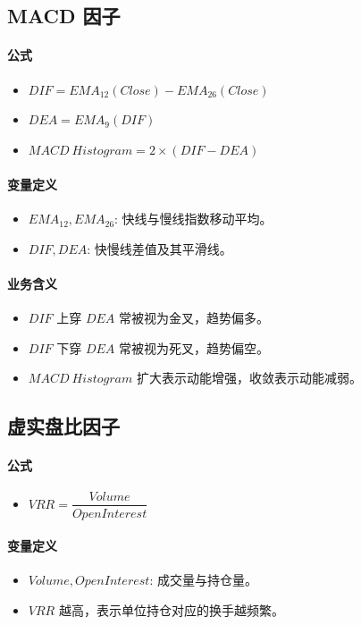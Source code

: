 \documentclass[11pt,a4paper]{ctexart}
\begin{document}
\subsection{MACD 因子}
\paragraph{公式}
\begin{itemize}
\item $DIF=EMA_{12}(Close)-EMA_{26}(Close)$
\item $DEA=EMA_{9}(DIF)$
\item $MACD\ Histogram=2\times(DIF-DEA)$
\end{itemize}
\paragraph{变量定义}
\begin{itemize}
\item $EMA_{12}, EMA_{26}$: 快线与慢线指数移动平均。
\item $DIF, DEA$: 快慢线差值及其平滑线。
\end{itemize}
\paragraph{业务含义}
\begin{itemize}
\item $DIF$ 上穿 $DEA$ 常被视为金叉，趋势偏多。
\item $DIF$ 下穿 $DEA$ 常被视为死叉，趋势偏空。
\item $MACD\ Histogram$ 扩大表示动能增强，收敛表示动能减弱。
\end{itemize}
\subsection{虚实盘比因子}
\paragraph{公式}
\begin{itemize}
\item $VRR=\dfrac{Volume}{OpenInterest}$
\end{itemize}
\paragraph{变量定义}
\begin{itemize}
\item $Volume, OpenInterest$: 成交量与持仓量。
\item $VRR$ 越高，表示单位持仓对应的换手越频繁。
\end{itemize}
\end{document}
